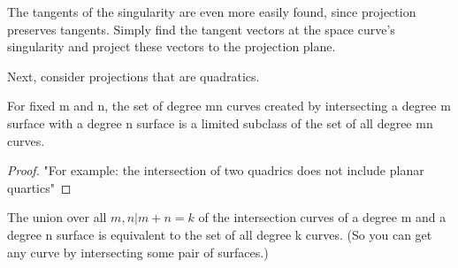 The tangents of the singularity are even more easily found,
since projection preserves tangents.
Simply find the tangent vectors at the space curve's singularity
and project these vectors to the projection plane.

Next, consider projections that are quadratics.

\begin{conjecture}
For fixed m and n, the set of degree mn curves created by intersecting
a degree m surface with a degree n surface is a limited subclass of the
set of all degree mn curves.
\end{conjecture}
\begin{proof}
"For example: the intersection of two quadrics does not include planar
quartics"
\end{proof}
%
\begin{conjecture}
The union over all ${m,n|m+n=k}$ of the intersection curves of a degree m
and a degree n surface is equivalent to the set of all degree k curves.
(So you can get any curve by intersecting some pair of surfaces.)
\end{conjecture}


